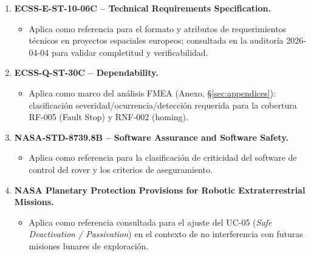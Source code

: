 \begin{enumerate}
    \item \textbf{ECSS-E-ST-10-06C – Technical Requirements Specification.} \cite{ecss_e_st_10_06c}
    \begin{itemize}
        \item Aplica como referencia para el formato y atributos de requerimientos técnicos en proyectos espaciales europeos; consultada en la auditoría 2026-04-04 para validar completitud y verificabilidad.
    \end{itemize}

    \item \textbf{ECSS-Q-ST-30C – Dependability.} \cite{ecss_q_st_30}
    \begin{itemize}
        \item Aplica como marco del análisis FMEA (Anexo, \S\ref{sec:appendices}): clasificación severidad/ocurrencia/detección requerida para la cobertura RF-005 (Fault Stop) y RNF-002 (homing).
    \end{itemize}

    \item \textbf{NASA-STD-8739.8B – Software Assurance and Software Safety.} \cite{nasa_std_8739_8}
    \begin{itemize}
        \item Aplica como referencia para la clasificación de criticidad del software de control del rover y los criterios de aseguramiento.
    \end{itemize}

    \item \textbf{NASA Planetary Protection Provisions for Robotic Extraterrestrial Missions.} \cite{nasa_planetary_protection}
    \begin{itemize}
        \item Aplica como referencia consultada para el ajuste del UC-05 (\textit{Safe Deactivation / Passivation}) en el contexto de no interferencia con futuras misiones lunares de exploración.
    \end{itemize}
\end{enumerate}
